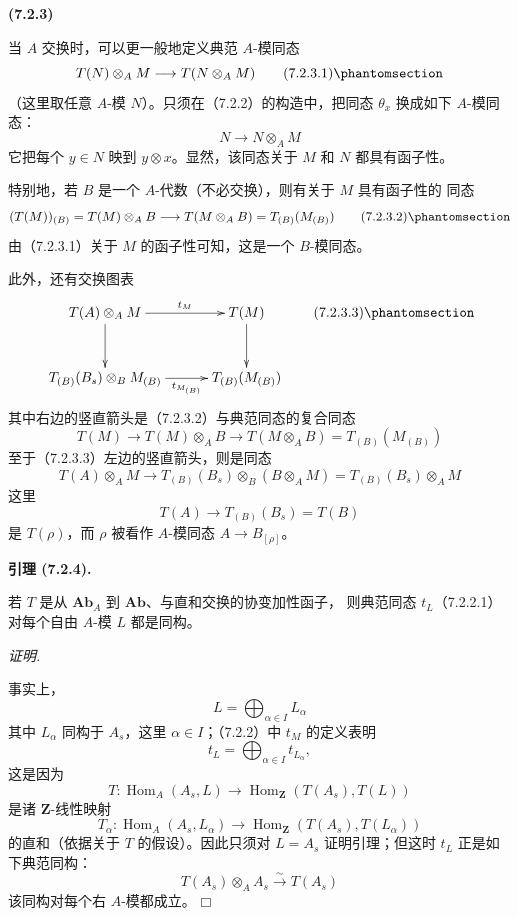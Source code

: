 \documentclass[UTF8,fontset=none,11pt,oneside,openany]{ctexbook}
\providecommand{\square}{\mdlgwhtsquare}
\newenvironment{env}[1][]{%
  \par\medskip\noindent\textbf{(#1)}\ %
}{\par}
\newenvironment{lemma}[1][]{%
  \par\medskip\noindent\textbf{引理 (#1).}\ %
}{\par}
\newenvironment{proof}{%
  \par\smallskip\noindent\textit{证明.}\ %
}{\hfill$\square$\par}
\newcommand{\oldpage}[2][]{%
  \hypertarget{ega-source-page-#1-#2}{}%
  \marginnote{\scriptsize\textbf{#1}~|~#2}\ignorespaces}
\let\EGAOriginalLabel\label
\renewcommand{\label}[1]{\phantomsection\EGAOriginalLabel{#1}}
\begin{document}
\begin{env}[7.2.3]
当 $A$ 交换时，可以更一般地定义典范 $A$-模同态
\[
  T(N)\otimes_A M\longrightarrow T(N\otimes_A M)
  \tag{7.2.3.1}\label{III.7.2.3.1.fr}
\]
（这里取任意 $A$-模 $N$）。只须在（7.2.2）的构造中，把同态
$\theta_x$ 换成如下 $A$-模同态：
\[
  N\longrightarrow N\otimes_A M
\]
它把每个 $y\in N$ 映到 $y\otimes x$。显然，该同态关于 $M$ 和 $N$
都具有函子性。

\oldpage[III]{178}
特别地，若 $B$ 是一个 $A$-代数（不必交换），则有关于 $M$ 具有函子性的
同态
\[
  (T(M))_{(B)}
  =
  T(M)\otimes_A B
  \longrightarrow
  T(M\otimes_A B)
  =
  T_{(B)}(M_{(B)})
  \tag{7.2.3.2}\label{III.7.2.3.2.fr}
\]
由（7.2.3.1）关于 $M$ 的函子性可知，这是一个 $B$-模同态。

此外，还有交换图表
\[
\xymatrix@C=30pt@R=30pt{
  T(A)\otimes_A M
  \ar[r]^-{t_M}\ar[d]
  &
  T(M)\ar[d]
  \\
  T_{(B)}(B_s)\otimes_B M_{(B)}
  \ar[r]_-{t_{M_{(B)}}}
  &
  T_{(B)}(M_{(B)})
}
\tag{7.2.3.3}\label{III.7.2.3.3.fr}
\]
其中右边的竖直箭头是（7.2.3.2）与典范同态的复合同态
\[
  T(M)
  \longrightarrow
  T(M)\otimes_A B
  \longrightarrow
  T(M\otimes_A B)
  =
  T_{(B)}(M_{(B)})
\]
至于（7.2.3.3）左边的竖直箭头，则是同态
\[
  T(A)\otimes_A M
  \longrightarrow
  T_{(B)}(B_s)\otimes_B(B\otimes_A M)
  =
  T_{(B)}(B_s)\otimes_A M
\]
这里
\[
  T(A)\longrightarrow T_{(B)}(B_s)=T(B)
\]
是 $T(\rho)$，而 $\rho$ 被看作 $A$-模同态 $A\to B_{[\rho]}$。
\end{env}

\begin{lemma}[7.2.4]
若 $T$ 是从 $\mathbf{Ab}_A$ 到 $\mathbf{Ab}$、与直和交换的协变加性函子，
则典范同态 $t_L$（7.2.2.1）对每个自由 $A$-模 $L$ 都是同构。
\end{lemma}

\begin{proof}
事实上，
\[
  L=\bigoplus_{\alpha\in I}L_\alpha
\]
其中 $L_\alpha$ 同构于 $A_s$，这里 $\alpha\in I$；（7.2.2）中
$t_M$ 的定义表明
\[
  t_L=\bigoplus_{\alpha\in I}t_{L_\alpha},
\]
这是因为
\[
  T:
  \operatorname{Hom}_A(A_s,L)
  \longrightarrow
  \operatorname{Hom}_{\mathbf Z}(T(A_s),T(L))
\]
是诸 $\mathbf Z$-线性映射
\[
  T_\alpha:
  \operatorname{Hom}_A(A_s,L_\alpha)
  \longrightarrow
  \operatorname{Hom}_{\mathbf Z}(T(A_s),T(L_\alpha))
\]
的直和（依据关于 $T$ 的假设）。因此只须对 $L=A_s$ 证明引理；但这时
$t_L$ 正是如下典范同构：
\[
  T(A_s)\otimes_A A_s\xrightarrow{\sim}T(A_s)
\]
该同构对每个右 $A$-模都成立。
\end{proof}
\end{document}
